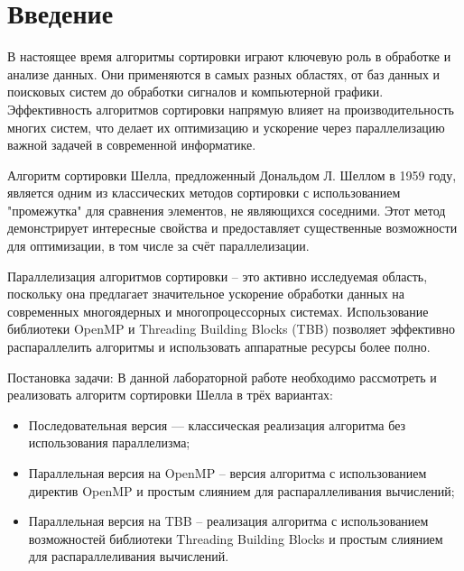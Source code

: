 \documentclass[]{article}
\theoremstyle{remark}
\theoremstyle{definition}
\begin{document}
\setcounter{page}{2}

\tableofcontents
\newpage

\section{Введение}

\par В настоящее время алгоритмы сортировки играют ключевую роль в обработке и анализе данных. Они применяются в самых разных областях, от баз данных и поисковых систем до обработки сигналов и компьютерной графики. Эффективность алгоритмов сортировки напрямую влияет на производительность многих систем, что делает их оптимизацию и ускорение через параллелизацию важной задачей в современной информатике.

\par Алгоритм сортировки Шелла, предложенный Дональдом Л. Шеллом в 1959 году, является одним из классических методов сортировки с использованием "промежутка" для сравнения элементов, не являющихся соседними. Этот метод демонстрирует интересные свойства и предоставляет существенные возможности для оптимизации, в том числе за счёт параллелизации.

\par Параллелизация алгоритмов сортировки -- это активно исследуемая область, поскольку она предлагает значительное ускорение обработки данных на современных многоядерных и многопроцессорных системах. Использование библиотеки OpenMP и Threading Building Blocks (TBB) позволяет эффективно распараллелить алгоритмы и использовать аппаратные ресурсы более полно.

\par Постановка задачи: В данной лабораторной работе необходимо рассмотреть и реализовать алгоритм сортировки Шелла в трёх вариантах:

\begin{itemize}
    \item Последовательная версия — классическая реализация алгоритма без использования параллелизма;
    \item Параллельная версия на OpenMP -- версия алгоритма с использованием директив OpenMP и простым слиянием для распараллеливания вычислений;
    \item Параллельная версия на TBB -- реализация алгоритма с использованием возможностей библиотеки Threading Building Blocks и простым слиянием для распараллеливания вычислений.
\end{itemize}
\end{document}
